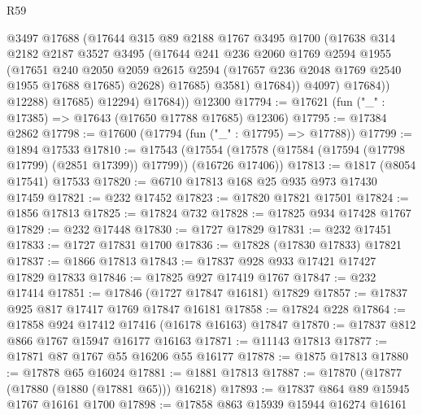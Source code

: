 \begin{lexlean}{R59}
\begin{coremodule}
                      @3497
                      @17688
                      (@17644
                        @315
                        @89
                        @2188
                        @1767
                        @3495
                        @1700
                        (@17638
                          @314
                          @2182
                          @2187
                          @3527
                          @3495
                          (@17644
                            @241
                            @236
                            @2060
                            @1769
                            @2594
                            @1955
                            (@17651
                              @240
                              @2050
                              @2059
                              @2615
                              @2594
                              (@17657 @236 @2048 @1769 @2540 @1955 @17688 @17685)
                              @2628)
                            @17685)
                          @3581)
                        @17684))
                    @4097)
                  @17684))
              @12288)
            @17685)
          @12294)
        @17684))
    @12300
@17794 := @17621 (fun ("_" : @17385) => @17643 (@17650 @17788 @17685) @12306)
@17795 := @17384 @2862
@17798 := @17600 (@17794 (fun ("_" : @17795) => @17788))
@17799 := @1894 @17533
@17810 := @17543
    (@17554 (@17578 (@17584 (@17594 (@17798 @17799) (@2851 @17399)) @17799)) (@16726 @17406))
@17813 := @1817 (@8054 @17541) @17533
@17820 := @6710 @17813 @168 @25 @935 @973 @17430 @17459
@17821 := @232 @17452
@17823 := @17820 @17821 @17501
@17824 := @1856 @17813
@17825 := @17824 @732
@17828 := @17825 @934 @17428 @1767
@17829 := @232 @17448
@17830 := @1727 @17829
@17831 := @232 @17451
@17833 := @1727 @17831 @1700
@17836 := @17828 (@17830 @17833) @17821
@17837 := @1866 @17813
@17843 := @17837 @928 @933 @17421 @17427 @17829 @17833
@17846 := @17825 @927 @17419 @1767
@17847 := @232 @17414
@17851 := @17846 (@1727 @17847 @16181) @17829
@17857 := @17837 @925 @817 @17417 @1769 @17847 @16181
@17858 := @17824 @228
@17864 := @17858 @924 @17412 @17416 (@16178 @16163) @17847
@17870 := @17837 @812 @866 @1767 @15947 @16177 @16163
@17871 := @11143 @17813
@17877 := @17871 @87 @1767 @55 @16206 @55 @16177
@17878 := @1875 @17813
@17880 := @17878 @65 @16024
@17881 := @1881 @17813
@17887 := @17870 (@17877 (@17880 (@1880 (@17881 @65))) @16218)
@17893 := @17837 @864 @89 @15945 @1767 @16161 @1700
@17898 := @17858 @863 @15939 @15944 @16274 @16161

\end{coremodule}
\end{lexlean}
